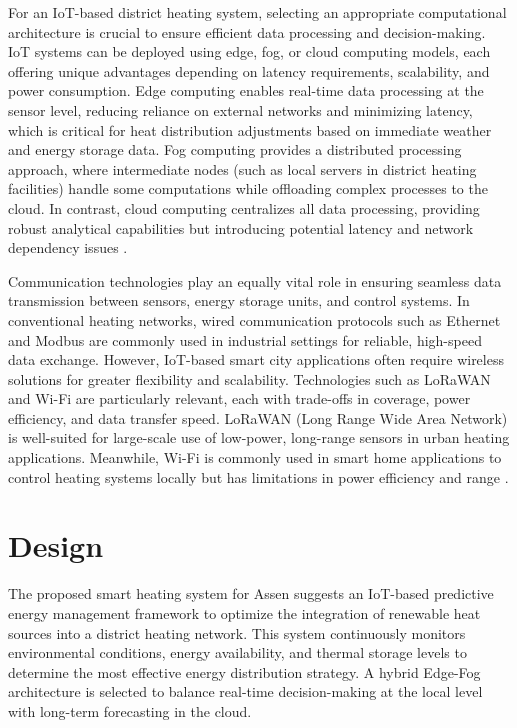 \documentclass[conference]{IEEEtran}
\begin{document}
For an IoT-based district heating system, selecting an appropriate computational architecture is crucial to ensure efficient data processing and decision-making. IoT systems can be deployed using edge, fog, or cloud computing models\cite{s21175922}, each offering unique advantages depending on latency requirements, scalability, and power consumption. Edge computing enables real-time data processing at the sensor level, reducing reliance on external networks and minimizing latency, which is critical for heat distribution adjustments based on immediate weather and energy storage data. Fog computing provides a distributed processing approach, where intermediate nodes (such as local servers in district heating facilities) handle some computations while offloading complex processes to the cloud. In contrast, cloud computing centralizes all data processing, providing robust analytical capabilities but introducing potential latency and network dependency issues \cite{iot_architecture}. 

Communication technologies play an equally vital role in ensuring seamless data transmission between sensors, energy storage units, and control systems. In conventional heating networks, wired communication protocols such as Ethernet and Modbus are commonly used in industrial settings for reliable, high-speed data exchange. However, IoT-based smart city applications often require wireless solutions for greater flexibility and scalability. Technologies such as LoRaWAN and Wi-Fi are particularly relevant, each with trade-offs in coverage, power efficiency, and data transfer speed. LoRaWAN (Long Range Wide Area Network) is well-suited for large-scale use of low-power, long-range sensors in urban heating applications. Meanwhile, Wi-Fi is commonly used in smart home applications to control heating systems locally but has limitations in power efficiency and range \cite{comm_tech_review}. 

\section{Design}

The proposed smart heating system for Assen suggests an IoT-based predictive energy management framework to optimize the integration of renewable heat sources into a district heating network. This system continuously monitors environmental conditions, energy availability, and thermal storage levels to determine the most effective energy distribution strategy. A hybrid Edge-Fog architecture is selected to balance real-time decision-making at the local level with long-term forecasting in the cloud.
\end{document}
